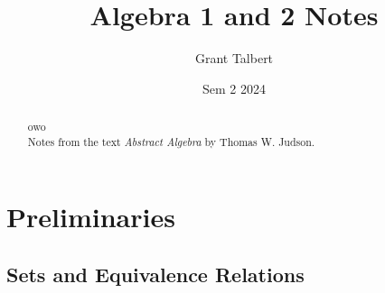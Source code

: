 \documentclass[12pt, letterpaper]{report}
\title{Algebra 1 and 2 Notes}
\author{Grant Talbert}
\date{Sem 2 2024}
\begin{document}
	\maketitle
	
	\begin{abstract}
		owo\\
		Notes from the text \emph{Abstract Algebra} by Thomas W. Judson.
	\end{abstract}
	
	\newpage
	
	\tableofcontents
	
	\newpage

\chapter{Preliminaries}
\section{Sets and Equivalence Relations}
\end{document}
